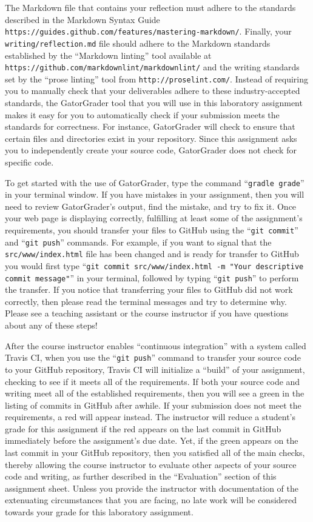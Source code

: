 \documentclass[11pt]{article}
\newcommand{\mainprogramsource}{\lstinline{src/www/index.html}}
\newcommand{\reflection}{\lstinline{writing/reflection.md}}
\newcommand{\gatorgraderstart}{\command{gradle grade}}
\newcommand{\gitcommit}{\command{git commit}}
\newcommand{\gitpush}{\command{git push}}
\newcommand{\gitcommitmainprogram}{\command{git commit src/www/index.html -m "Your
descriptive commit message"}}
\newcommand{\command}[1]{``\lstinline{#1}''}
\newcommand{\url}[1]{\lstinline{#1}}
\newcommand{\step}[1]{``{#1}''}
\newcommand{\checkmark}{\ding{51}}
\newcommand{\naughtmark}{\ding{55}}
\begin{document}
The Markdown file that contains your reflection must adhere to the standards
described in the Markdown Syntax Guide
\url{https://guides.github.com/features/mastering-markdown/}. Finally, your
\reflection{} file should adhere to the Markdown standards established by the
\step{Markdown linting} tool available at
\url{https://github.com/markdownlint/markdownlint/} and the writing standards
set by the \step{prose linting} tool from \url{http://proselint.com/}. Instead
of requiring you to manually check that your deliverables adhere to these
industry-accepted standards, the GatorGrader tool that you will use in this
laboratory assignment makes it easy for you to automatically check if your
submission meets the standards for correctness. For instance, GatorGrader will
check to ensure that certain files and directories exist in your repository.
Since this assignment asks you to independently create your source code,
GatorGrader does not check for specific code.

To get started with the use of GatorGrader, type the command \gatorgraderstart{}
in your terminal window. If you have mistakes in your assignment, then you will
need to review GatorGrader's output, find the mistake, and try to fix it. Once
your web page is displaying correctly, fulfilling at least some of the
assignment's requirements, you should transfer your files to GitHub using the
\gitcommit{} and \gitpush{} commands. For example, if you want to signal that
the \mainprogramsource{} file has been changed and is ready for transfer to
GitHub you would first type \gitcommitmainprogram{} in your terminal, followed
by typing \gitpush{} to perform the transfer.
%
If you notice that transferring your files to GitHub did not work correctly,
then please read the terminal messages and try to determine why.
%
Please see a teaching assistant or the course instructor if you have questions
about any of these steps!

After the course instructor enables \step{continuous integration} with a system
called Travis CI, when you use the \gitpush{} command to transfer your source
code to your GitHub repository, Travis CI will initialize a \step{build} of your
assignment, checking to see if it meets all of the requirements. If both your
source code and writing meet all of the established requirements, then you will
see a green \checkmark{} in the listing of commits in GitHub after awhile. If
your submission does not meet the requirements, a red \naughtmark{} will appear
instead. The instructor will reduce a student's grade for this assignment if the
red \naughtmark{} appears on the last commit in GitHub immediately before the
assignment's due date. Yet, if the green \checkmark{} appears on the last commit
in your GitHub repository, then you satisfied all of the main checks, thereby
allowing the course instructor to evaluate other aspects of your source code and
writing, as further described in the \step{Evaluation} section of this
assignment sheet. Unless you provide the instructor with documentation of the
extenuating circumstances that you are facing, no late work will be considered
towards your grade for this laboratory assignment.
\end{document}
